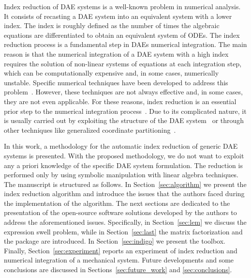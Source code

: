 Index reduction of \ac{DAE} systems is a well-known problem in numerical analysis. It consists of recasting a \ac{DAE} system into an equivalent system with a lower index. The index is roughly defined as the number of times the algebraic equations are differentiated to obtain an equivalent system of \acp{ODE}. The index reduction process is a fundamental step in \acp{DAE} numerical integration. The main reason is that the numerical integration of a \ac{DAE} system with a high index requires the solution of non-linear systems of equations at each integration step, which can be computationally expensive and, in some cases, numerically unstable. Specific numerical techniques have been developed to address this problem~\cite{petzold1982differential,thomsen1999numerical}. However, these techniques are not always effective and, in some cases, they are not even applicable. For these reasons, index reduction is an essential prior step to the numerical integration process~\cite{lamour2013differential}. Due to its complicated nature, it is usually carried out by exploiting the structure of the \ac{DAE} system~\cite{zhou2005implicit,zhou2007symbolic} or through other techniques like generalized coordinate partitioning~\cite{wehage1982generalized}.

In this work, a methodology for the automatic index reduction of generic \ac{DAE} systems is presented. With the proposed methodology, we do not want to exploit any a priori knowledge of the specific \ac{DAE} system formulation. The reduction is performed only by using symbolic manipulation with linear algebra techniques. The manuscript is structured as follows. In Section~\ref{sec:algorithm} we present the index reduction algorithm and introduce the issues that the authors faced during the implementation of the algorithm. The next sections are dedicated to the presentation of the open-source software solutions developed by the authors to address the aforementioned issues. Specifically, in Section~\ref{sec:lem} we discuss the expression swell problem, while in Section~\ref{sec:last} the matrix factorization and the \LAST{} package are introduced. In Section~\ref{sec:indigo} we present the \Indigo{} toolbox. Finally, Section~\ref{sec:experiment} reports an experiment of index reduction and numerical integration of a mechanical system. Future developments and some conclusions are discussed in Sections~\ref{sec:future_work} and \ref{sec:conclusions}.


